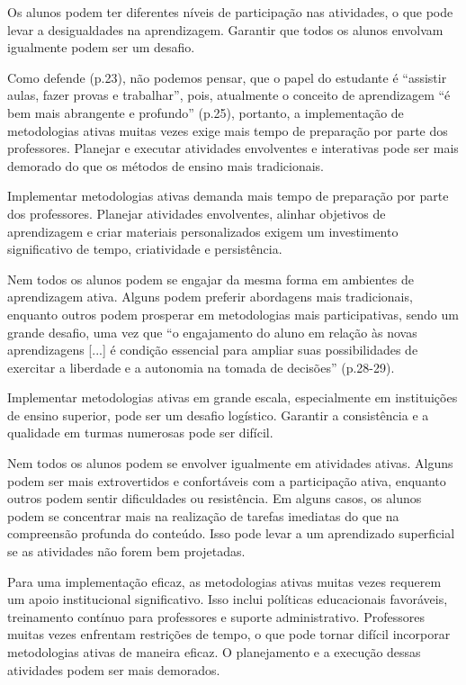 Os alunos podem ter diferentes níveis de participação nas atividades, o que pode levar a desigualdades na aprendizagem. Garantir que todos os alunos envolvam igualmente podem ser um desafio.

Como defende  (p.23), não podemos pensar, que o papel do estudante é ``assistir aulas, fazer provas e trabalhar'', pois, atualmente o conceito de aprendizagem ``é bem mais abrangente e profundo'' (p.25), portanto, a implementação de metodologias ativas muitas vezes exige mais tempo de preparação por parte dos professores. Planejar e executar atividades envolventes e interativas pode ser mais demorado do que os métodos de ensino mais tradicionais.

Implementar metodologias ativas demanda mais tempo de preparação por parte dos professores. Planejar atividades envolventes, alinhar objetivos de aprendizagem e criar materiais personalizados exigem um investimento significativo de tempo, criatividade e persistência.

Nem todos os alunos podem se engajar da mesma forma em ambientes de aprendizagem ativa. Alguns podem preferir abordagens mais tradicionais, enquanto outros podem prosperar em metodologias mais participativas, sendo um grande desafio, uma vez que ``o engajamento do aluno em relação às novas aprendizagens [...] é condição essencial para ampliar suas possibilidades de exercitar a liberdade e a autonomia na tomada de decisões'' \cite{BERBEL2011} (p.28-29).

Implementar metodologias ativas em grande escala, especialmente em instituições de ensino superior, pode ser um desafio logístico. Garantir a consistência e a qualidade em turmas numerosas pode ser difícil.

Nem todos os alunos podem se envolver igualmente em atividades ativas. Alguns podem ser mais extrovertidos e confortáveis com a participação ativa, enquanto outros podem sentir dificuldades ou resistência. Em alguns casos, os alunos podem se concentrar mais na realização de tarefas imediatas do que na compreensão profunda do conteúdo. Isso pode levar a um aprendizado superficial se as atividades não forem bem projetadas.

Para uma implementação eficaz, as metodologias ativas muitas vezes requerem um apoio institucional significativo. Isso inclui políticas educacionais favoráveis, treinamento contínuo para professores e suporte administrativo. Professores muitas vezes enfrentam restrições de tempo, o que pode tornar difícil incorporar metodologias ativas de maneira eficaz. O planejamento e a execução dessas atividades podem ser mais demorados.

